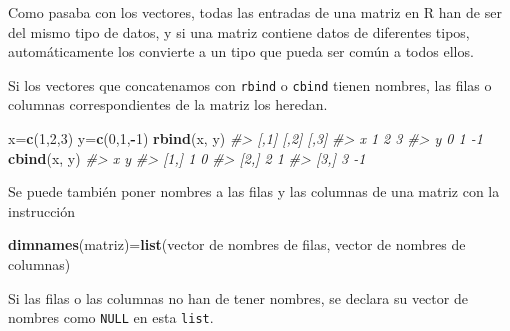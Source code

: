 \documentclass[
]{book}
\newenvironment{Shaded}{\begin{snugshade}}{\end{snugshade}}
\newcommand{\CommentTok}[1]{\textcolor[rgb]{0.56,0.35,0.01}{\textit{#1}}}
\newcommand{\DecValTok}[1]{\textcolor[rgb]{0.00,0.00,0.81}{#1}}
\newcommand{\KeywordTok}[1]{\textcolor[rgb]{0.13,0.29,0.53}{\textbf{#1}}}
\newcommand{\NormalTok}[1]{#1}
\newcommand{\OperatorTok}[1]{\textcolor[rgb]{0.81,0.36,0.00}{\textbf{#1}}}
\theoremstyle{definition}
\theoremstyle{definition}
\theoremstyle{definition}
\theoremstyle{remark}
\begin{document}
Como pasaba con los vectores, todas las entradas de una matriz en R han de ser del mismo tipo de datos, y si una matriz contiene datos de diferentes tipos, automáticamente los convierte a un tipo que pueda ser común a todos ellos.

Si los vectores que concatenamos con \texttt{rbind} o \texttt{cbind} tienen nombres, las filas o columnas correspondientes de la matriz los heredan.

\begin{Shaded}
\begin{Highlighting}[]
\NormalTok{x=}\KeywordTok{c}\NormalTok{(}\DecValTok{1}\NormalTok{,}\DecValTok{2}\NormalTok{,}\DecValTok{3}\NormalTok{)}
\NormalTok{y=}\KeywordTok{c}\NormalTok{(}\DecValTok{0}\NormalTok{,}\DecValTok{1}\NormalTok{,}\OperatorTok{{-}}\DecValTok{1}\NormalTok{)}
\KeywordTok{rbind}\NormalTok{(x, y)}
\CommentTok{\#\textgreater{}   [,1] [,2] [,3]}
\CommentTok{\#\textgreater{} x    1    2    3}
\CommentTok{\#\textgreater{} y    0    1   {-}1}
\KeywordTok{cbind}\NormalTok{(x, y)}
\CommentTok{\#\textgreater{}      x  y}
\CommentTok{\#\textgreater{} [1,] 1  0}
\CommentTok{\#\textgreater{} [2,] 2  1}
\CommentTok{\#\textgreater{} [3,] 3 {-}1}
\end{Highlighting}
\end{Shaded}

Se puede también poner nombres a las filas y las columnas de una matriz con la instrucción

\begin{Shaded}
\begin{Highlighting}[]
\KeywordTok{dimnames}\NormalTok{(matriz)=}\KeywordTok{list}\NormalTok{(vector de nombres de filas, vector de nombres de columnas)}
\end{Highlighting}
\end{Shaded}

Si las filas o las columnas no han de tener nombres, se declara su vector de nombres como \texttt{NULL} en esta \texttt{list}.
\end{document}
